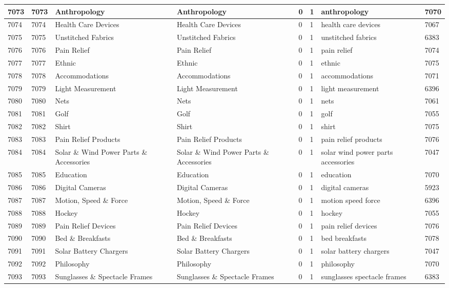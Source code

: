 \begin{longtable}{|l|l|l|l|l|l|l|l|}
7073 & 7073 & Anthropology & Anthropology & 0 & 1 & anthropology & 7070 \\ \hline 
7074 & 7074 & Health Care Devices & Health Care Devices & 0 & 1 & health care devices & 7067 \\ \hline 
7075 & 7075 & Unstitched Fabrics & Unstitched Fabrics & 0 & 1 & unstitched fabrics & 6383 \\ \hline 
7076 & 7076 & Pain Relief & Pain Relief & 0 & 1 & pain relief & 7074 \\ \hline 
7077 & 7077 & Ethnic & Ethnic & 0 & 1 & ethnic & 7075 \\ \hline 
7078 & 7078 & Accommodations & Accommodations & 0 & 1 & accommodations & 7071 \\ \hline 
7079 & 7079 & Light Measurement & Light Measurement & 0 & 1 & light measurement & 6396 \\ \hline 
7080 & 7080 & Nets & Nets & 0 & 1 & nets & 7061 \\ \hline 
7081 & 7081 & Golf & Golf & 0 & 1 & golf & 7055 \\ \hline 
7082 & 7082 & Shirt & Shirt & 0 & 1 & shirt & 7075 \\ \hline 
7083 & 7083 & Pain Relief Products & Pain Relief Products & 0 & 1 & pain relief products & 7076 \\ \hline 
7084 & 7084 & Solar \& Wind Power Parts \& Accessories & Solar \& Wind Power Parts \& Accessories & 0 & 1 & solar wind power parts accessories & 7047 \\ \hline 
7085 & 7085 & Education & Education & 0 & 1 & education & 7070 \\ \hline 
7086 & 7086 & Digital Cameras & Digital Cameras & 0 & 1 & digital cameras & 5923 \\ \hline 
7087 & 7087 & Motion, Speed \& Force & Motion, Speed \& Force & 0 & 1 & motion speed force & 6396 \\ \hline 
7088 & 7088 & Hockey & Hockey & 0 & 1 & hockey & 7055 \\ \hline 
7089 & 7089 & Pain Relief Devices & Pain Relief Devices & 0 & 1 & pain relief devices & 7076 \\ \hline 
7090 & 7090 & Bed \& Breakfasts & Bed \& Breakfasts & 0 & 1 & bed breakfasts & 7078 \\ \hline 
7091 & 7091 & Solar Battery Chargers & Solar Battery Chargers & 0 & 1 & solar battery chargers & 7047 \\ \hline 
7092 & 7092 & Philosophy & Philosophy & 0 & 1 & philosophy & 7070 \\ \hline 
7093 & 7093 & Sunglasses \& Spectacle Frames & Sunglasses \& Spectacle Frames & 0 & 1 & sunglasses spectacle frames & 6383 \\ \hline 

\end{longtable}
